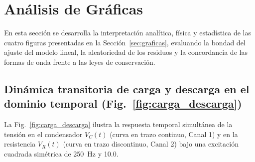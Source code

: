 
\section{Análisis de Gráficas}
\label{sec:analisis_graficas}

En esta sección se desarrolla la interpretación analítica, física y estadística de las cuatro figuras presentadas en la Sección~\ref{sec:graficas}, evaluando la bondad del ajuste del modelo lineal, la aleatoriedad de los residuos y la concordancia de las formas de onda frente a las leyes de conservación.

\subsection{Dinámica transitoria de carga y descarga en el dominio temporal (Fig.~\ref{fig:carga_descarga})}

La Fig.~\ref{fig:carga_descarga} ilustra la respuesta temporal simultánea de la tensión en el condensador $V_C(t)$ (curva en trazo continuo, Canal 1) y en la resistencia $V_R(t)$ (curva en trazo discontinuo, Canal 2) bajo una excitación cuadrada simétrica de \qty{250}{\hertz} y \qty{10,0}{\voltpp}.

